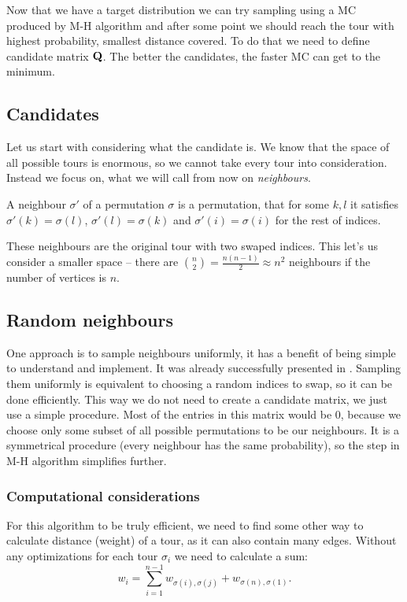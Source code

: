 Now that we have a target distribution we can try sampling using a MC produced by M-H algorithm and after some point we should reach the tour with highest probability, \ie smallest distance covered. To do that we need to define candidate matrix $\mathbf{Q}$. The better the candidates, the faster MC can get to the minimum.

\subsection{Candidates}
	Let us start with considering what the candidate is. We know that the space of all possible tours is enormous, so we cannot take every tour into consideration. Instead we focus on, what we will call from now on \textit{neighbours}.
	\begin{definition}
		A neighbour $\sigma'$ of a permutation $\sigma$ is a permutation, that for some $k, l$ it satisfies $\sigma'(k) = \sigma(l)$, $\sigma'(l) = \sigma(k)$ and $\sigma'(i) = \sigma(i)$ for the rest of indices.
	\end{definition}
	These neighbours are the original tour with two swaped indices. This let's us consider a smaller space -- there are $\binom{n}{2} = \frac{n(n-1)}{2} \approx n^2$ neighbours if the number of vertices is $n$.

\subsection{Random neighbours}
	One approach is to sample neighbours uniformly, it has a benefit of being simple to understand and implement. It was already successfully presented in \cite{decryption_tsp_MCMC}. Sampling them uniformly is equivalent to choosing a random indices to swap, so it can be done efficiently. This way we do not need to create a candidate matrix, we just use a simple procedure. Most of the entries in this matrix would be $0$, because we choose only some subset of all possible permutations to be our neighbours. It is a symmetrical procedure (every neighbour has the same probability), so the step in M-H algorithm simplifies further.
	
	\subsubsection{Computational considerations}
		For this algorithm to be truly efficient, we need to find some other way to calculate distance (weight) of a tour, as it can also contain many edges. Without any optimizations for each tour $\sigma_i$ we need to calculate a sum:
		\begin{equation*}
			w_i = \sum_{i=1}^{n-1} w_{\sigma(i), \sigma(j)} + w_{\sigma(n), \sigma(1)}.
		\end{equation*}
		
